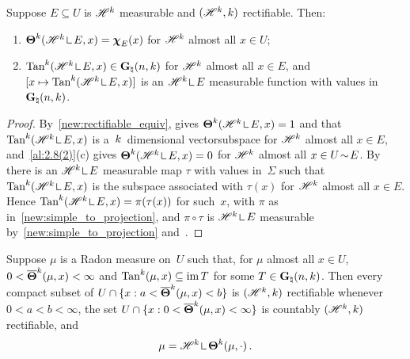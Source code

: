 \begin{lemma}
    \label{al:2.8(4)(a)}
    Suppose $E \subseteq U$ is $\mathscr{H}^{k}$ measurable and $(\mathscr{H}^{k},k)$ rectifiable.
    Then:
    \begin{enumerate}
        \item $\density^{\vdim}(\HM^{\vdim} \restrict E, x) = \CF{E}(x)$ for $\mathscr{H}^{k}$ almost all
            $x \in U$;
        \item $\Tan^{\vdim}(\HM^{\vdim} \restrict E, x) \in \pgrass{\adim}{\vdim}$ for $\mathscr{H}^{k}$
            almost all $x \in E$, and $[x \mapsto \Tan^{\vdim}(\HM^{\vdim} \restrict E, x)]$ is
            an $\HM^{\vdim} \restrict E$ measurable function with values in
            $\mathbf{G}_{\natural}(n,k)$.
    \end{enumerate}
\end{lemma}

\begin{proof}
    By~\ref{new:rectifiable_equiv}, \cite[3.2.19]{Federer1969} gives $\density^{\vdim}(\HM^{\vdim}
    \restrict E, x) = 1$ and that $\Tan^{\vdim}(\HM^{\vdim} \restrict E, x)$ is a~$k$~dimensional
    vectorsubspace for $\mathscr{H}^{k}$ almost all $x \in E$, and~\ref{al:2.8(2)}(c) gives
    $\density^{\vdim}(\HM^{\vdim} \restrict E, x) = 0$ for $\mathscr{H}^{k}$ almost all $x \in U
    \!\sim\! E$. By~\cite[3.2.25]{Federer1969} there is an $\HM^{\vdim} \restrict E$ measurable
    map $\tau$ with values in~$\Sigma$ such that $\Tan^{\vdim}(\HM^{\vdim} \restrict E, x)$ is the
    subspace associated with $\tau(x)$ for $\mathscr{H}^{k}$ almost all $x \in E$. Hence
    $\Tan^{\vdim}(\HM^{\vdim} \restrict E, x) = \pi(\tau(x))$ for such~$x$, with $\pi$ as
    in~\ref{new:simple_to_projection}, and $\pi \circ \tau$ is $\HM^{\vdim} \restrict E$
    measurable by~\ref{new:simple_to_projection} and~\cite[2.3.2]{Federer1969}.
\end{proof}

\begin{theorem}
    \label{al:2.8(5)}
    Suppose $\mu$ is a Radon measure on~$U$ such that, for $\mu$ almost all $x \in U$, $0 <
    \boldsymbol{\overline{\Theta}}^{k}(\mu,x) < \infty$ and $\operatorname{Tan}^{k}(\mu,x) \subseteq \operatorname{im} T$ for some $T \in
    \mathbf{G}_{\natural}(n,k)$. Then every compact subset of $U \cap \{ x : a <
    \boldsymbol{\overline{\Theta}}^{k}(\mu,x) < b \}$ is $(\mathscr{H}^{k},k)$ rectifiable whenever $0 < a < b <
    \infty$, the set $U \cap \{ x : 0 < \boldsymbol{\overline{\Theta}}^{k}(\mu,x) < \infty \}$ is countably
    $(\mathscr{H}^{k},k)$ rectifiable, and
    \begin{displaymath}
        \mu = \HM^{\vdim} \restrict \density^{\vdim}(\mu,\cdot) \,.
    \end{displaymath}
\end{theorem}

